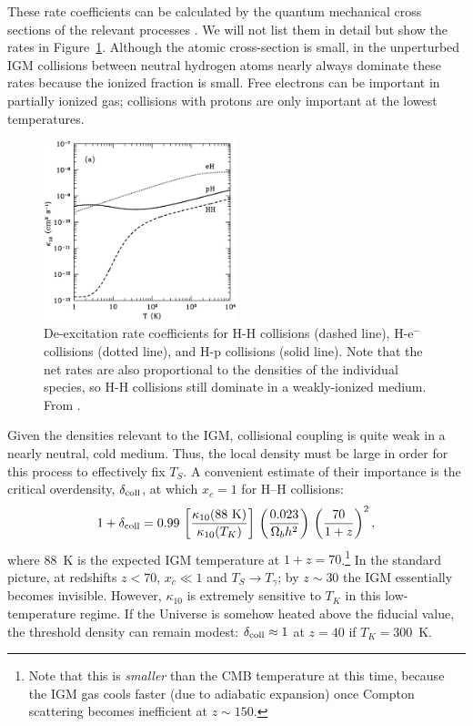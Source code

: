 \documentclass[a4paper,openany, 12pt]{book}
\begin{document}
These rate coefficients can be calculated by the quantum mechanical cross sections of the relevant processes \cite{zygelman05, furl07-electron, furl07-proton}. We will not list them in detail but show the rates in Figure~\ref{fig:collrates}.  Although the atomic cross-section is small, in the unperturbed IGM collisions between neutral hydrogen atoms nearly always dominate these rates because the ionized fraction is small.  Free electrons can be important in partially ionized gas; collisions with protons are only important at the lowest temperatures.

\begin{figure}[]
\begin{center}
\includegraphics[width=0.5\textwidth]{figure2-1}
\end{center}
\caption{De-excitation rate coefficients for H-H collisions (dashed
line), H-e$^-$ collisions (dotted line), and H-p collisions (solid
line).  Note that the net rates are also proportional to the densities
of the individual species, so H-H collisions still dominate in a
weakly-ionized medium. From \cite{furl07-proton}.}
\label{fig:collrates}
\end{figure}

Given the densities relevant to the IGM, collisional coupling is quite weak in a nearly neutral, cold medium.  Thus, the local density must be large in order for this process to effectively fix $T_S$. A convenient estimate of their
importance is the critical overdensity, $\delta_{\rm coll}$, at which
$x_c=1$ for H--H collisions:
\begin{equation}
1 + \delta_{\rm coll} = 0.99 \, \left[ \frac{\kappa_{10}(88 \ \mbox{K})}{\kappa_{10}(T_K)} \right] \, \left( \frac{0.023}{\Omega_b
    h^2} \right) \, \left( \frac{70}{1+z} \right)^2,
\label{eq:dcoll}
\end{equation}
where 88~K is the expected IGM temperature at $1+z=70$.\footnote{Note that this is \emph{smaller} than the CMB temperature at this time, because the IGM gas cools faster (due to adiabatic expansion) once Compton scattering becomes inefficient at $z \sim 150$.}  In the standard picture, at redshifts $z < 70$, $x_c \ll 1$ and $T_S \rightarrow T_{\gamma}$; by $z \sim 30$ the IGM essentially becomes invisible.  However, $\kappa_{10}$ is extremely sensitive to $T_K$ in this low-temperature regime.  If the Universe is somehow heated above the fiducial value, the threshold density can remain modest: $\delta_{\rm coll} \approx 1$ at $z=40$ if $T_K=300$~K.
\end{document}
